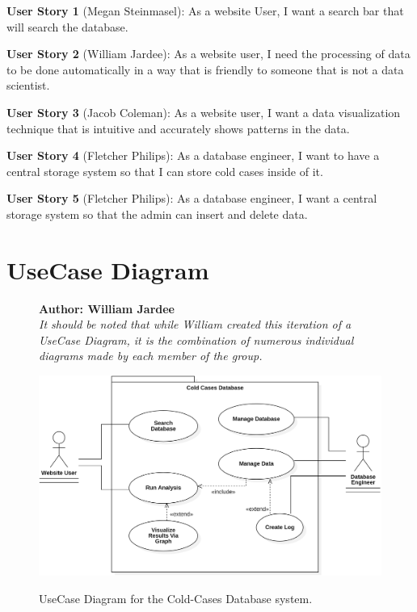 \documentclass[11pt]{article}
\begin{document}
\noindent\textbf{\hypertarget{us1}{User Story 1}} (Megan Steinmasel):  As a website User, I want a search bar that will search the database.\vspace{0.5em}

\noindent\textbf{\hypertarget{us2}{User Story 2}} (William Jardee): As a website user, I need the processing of data to be done automatically in a way that is friendly to someone that is not a data scientist.\vspace{0.5em}

\noindent\textbf{\hypertarget{us3}{User Story 3}} (Jacob Coleman): As a website user, I want a data visualization technique that is intuitive and accurately shows patterns in the data.\vspace{0.5em}

\noindent\textbf{\hypertarget{us4}{User Story 4}} (Fletcher Philips): As a database engineer, I want to have a central storage system so that I can store cold cases inside of it. \vspace{0.5em}

\noindent\textbf{\hypertarget{us5}{User Story 5}} (Fletcher Philips): As a database engineer, I want a central storage system so that the admin can insert and delete data.\vspace{0.5em}

\clearpage



\section*{UseCase Diagram}

\begin{figure}[!ht]
\centering
\textbf{Author: William Jardee}\\
\textit{It should be noted that while William created this iteration of a UseCase Diagram, it is the combination of numerous individual diagrams made by each member of the group.}\vspace{0.5em}

	\includegraphics[width=.95\textwidth]{./UseCases/jardee_usecase_3}\\
	\caption{UseCase Diagram for the Cold-Cases Database system.}
	\label{fig:usecase_diagram}
\end{figure}
\clearpage
\end{document}
